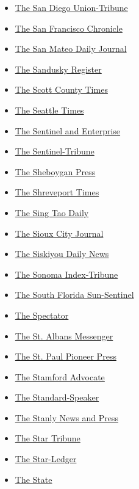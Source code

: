 \begin{itemize}
\item
  \href{https://www.sandiegouniontribune.com/}{The San Diego
  Union-Tribune}
\item
  \href{https://www.sfchronicle.com/}{The San Francisco Chronicle}
\item
  \href{https://www.smdailyjournal.com/}{The San Mateo Daily Journal}
\item
  \href{https://sanduskyregister.com/}{The Sandusky Register}
\item
  \href{https://www.sctonline.net/}{The Scott County Times}
\item
  \href{https://www.seattletimes.com/}{The Seattle Times}
\item
  \href{https://www.sentinelandenterprise.com/}{The Sentinel and
  Enterprise}
\item
  \href{https://www.sent-trib.com/}{The Sentinel-Tribune}
\item
  \href{https://www.sheboyganpress.com/}{The Sheboygan Press}
\item
  \href{https://www.shreveporttimes.com/}{The Shreveport Times}
\item
  \href{https://www.singtaousa.com/}{The Sing Tao Daily}
\item
  \href{https://siouxcityjournal.com/}{The Sioux City Journal}
\item
  \href{https://www.siskiyoudaily.com/}{The Siskiyou Daily News}
\item
  \href{https://www.sonomanews.com/}{The Sonoma Index-Tribune}
\item
  \href{https://www.sun-sentinel.com/}{The South Florida Sun-Sentinel}
\item
  \href{https://www.spectator.co.uk/}{The Spectator}
\item
  \href{https://www.samessenger.com/}{The St. Albans Messenger}
\item
  \href{https://www.twincities.com/}{The St. Paul Pioneer Press}
\item
  \href{https://www.stamfordadvocate.com/}{The Stamford Advocate}
\item
  \href{https://www.standardspeaker.com/}{The Standard-Speaker}
\item
  \href{https://www.thesnaponline.com/}{The Stanly News and Press}
\item
  \href{https://www.startribune.com/}{The Star Tribune}
\item
  \href{https://www.nj.com/starledger/}{The Star-Ledger}
\item
  \href{https://www.thestate.com/}{The State}

\end{itemize}
